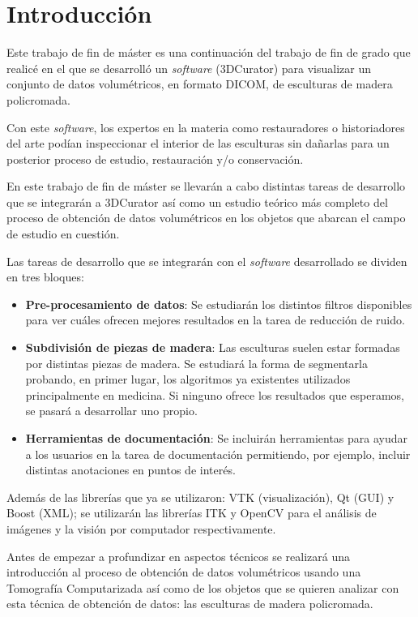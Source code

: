 \chapter{Introducción}

Este trabajo de fin de máster es una continuación del trabajo de fin de grado que realicé en el que se desarrolló un \textit{software} (3DCurator) para visualizar un conjunto de datos volumétricos, en formato DICOM, de esculturas de madera policromada.

Con este \textit{software}, los expertos en la materia como restauradores o historiadores del arte podían inspeccionar el interior de las esculturas sin dañarlas para un posterior proceso de estudio, restauración y/o conservación.

En este trabajo de fin de máster se llevarán a cabo distintas tareas de desarrollo que se integrarán a 3DCurator así como un estudio teórico más completo del proceso de obtención de datos volumétricos en los objetos que abarcan el campo de estudio en cuestión.

Las tareas de desarrollo que se integrarán con el \textit{software} desarrollado se dividen en tres bloques:

\begin{itemize}
	\item \textbf{Pre-procesamiento de datos}: Se estudiarán los distintos filtros disponibles para ver cuáles ofrecen mejores resultados en la tarea de reducción de ruido.
	\item \textbf{Subdivisión de piezas de madera}: Las esculturas suelen estar formadas por distintas piezas de madera. Se estudiará la forma de segmentarla probando, en primer lugar, los algoritmos ya existentes utilizados principalmente en medicina. Si ninguno ofrece los resultados que esperamos, se pasará a desarrollar uno propio.
	\item \textbf{Herramientas de documentación}: Se incluirán herramientas para ayudar a los usuarios en la tarea de documentación permitiendo, por ejemplo, incluir distintas anotaciones en puntos de interés.
\end{itemize}

Además de las librerías que ya se utilizaron: VTK (visualización), Qt (GUI) y Boost (XML); se utilizarán las librerías ITK y OpenCV para el análisis de imágenes y la visión por computador respectivamente.

Antes de empezar a profundizar en aspectos técnicos se realizará una introducción al proceso de obtención de datos volumétricos usando una Tomografía Computarizada así como de los objetos que se quieren analizar con esta técnica de obtención de datos: las esculturas de madera policromada.

